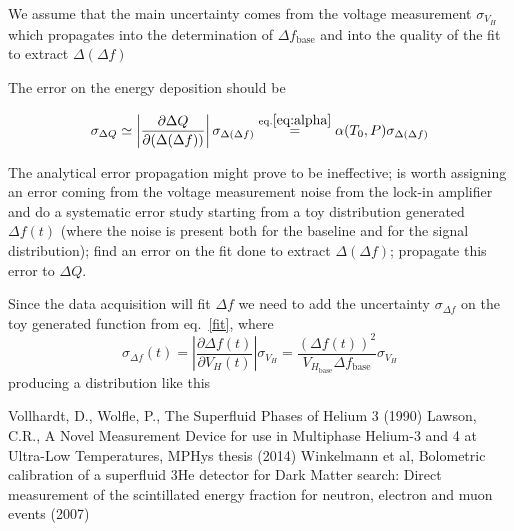 \documentclass[a4paper,10pt]{article}
\begin{document}
We assume that the main uncertainty comes from the voltage measurement $\sigma_{V_H}$ which propagates into the determination of $\Delta f_\mathrm{base}$
and into the quality of the fit to extract $\Delta (\Delta f)$

The error on the energy deposition should be

\begin{equation}
  \sigma_{\Delta Q}  \simeq \left| \frac{\partial \Delta Q}{\partial(\Delta(\Delta f))} \right| \sigma_{\Delta (\Delta f)} \overset{\mathrm{eq. \ref{eq:alpha}}}{=} \alpha (T_0,P) \sigma_{\Delta (\Delta f)}
\end{equation}

The analytical error propagation might prove to be ineffective; is worth assigning an error coming from the voltage measurement noise from the lock-in amplifier and do a systematic error study starting from a toy distribution generated $\Delta f(t)$ (where the noise is present both for the baseline and for the signal distribution); find an error on the fit done to extract $\Delta (\Delta f)$; propagate this error to $\Delta Q$.

Since the data acquisition will fit $\Delta f$ we need to add the uncertainty $\sigma_{\Delta f}$ on the toy generated function from eq.~\ref{fit}, where
\begin{equation}
\sigma_{\Delta f}(t) = \left| \frac{\partial \Delta f(t)}{\partial V_H(t)} \right| \sigma_{V_H} = \frac{(\Delta f(t))^2}{V_{H_{\mathrm{base}}} \Delta f_\mathrm{base}} \sigma_{V_H}
\end{equation}
producing a distribution like this

\pagebreak
\newpage

\begin{thebibliography}{9}

 Vollhardt, D., Wolfle, P., The Superfluid Phases of Helium 3 (1990)
 Lawson, C.R., A Novel Measurement Device for use in Multiphase Helium-3 and 4 at Ultra-Low Temperatures, MPHys thesis (2014)
 Winkelmann et al, Bolometric calibration of a superfluid 3He detector for Dark Matter search: Direct measurement of the scintillated energy fraction for
neutron, electron and muon events (2007)

\end{thebibliography}
\end{document}
